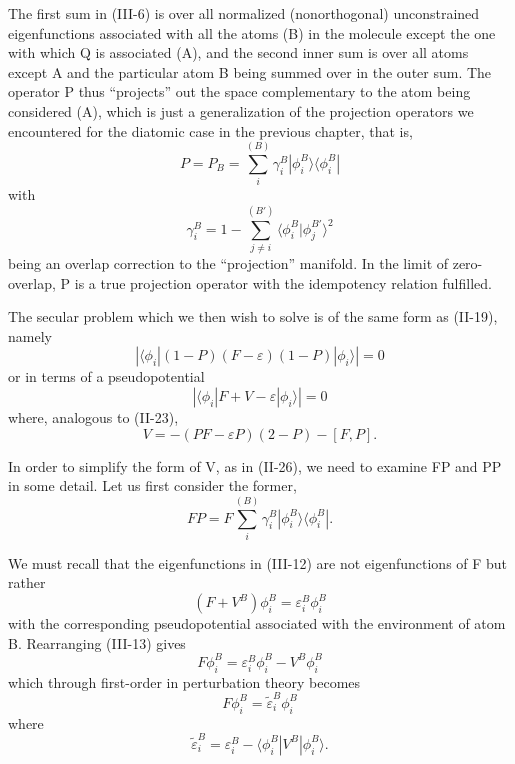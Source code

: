 \documentclass[12pt,letterpaper]{report}
\begin{document}
The first sum in (III-6) is over all normalized (nonorthogonal) unconstrained eigenfunctions associated with all the atoms (B) in the molecule except the one with which Q is associated (A), and the second inner sum is over all atoms except A and the particular atom B being summed over in the outer sum. The operator P thus ``projects'' out the space complementary to the atom being considered (A), which is just a generalization of the projection operators we encountered for the diatomic case in the previous chapter, that is,
\begin{equation}
P = P_B = \sum_i^{(B)} \gamma_i^B |\phi_i^B \rangle \langle \phi_i^B|
\end{equation}
with
\begin{equation}
\gamma_i^B = 1 - \sum_{j \neq i}^{(B')} \langle \phi_i^B | \phi_j^{B'} \rangle^2
\end{equation}
being an overlap correction to the ``projection'' manifold. In the limit of zero-overlap, P is a true projection operator with the idempotency relation fulfilled.

The secular problem which we then wish to solve is of the same form as (II-19), namely
\begin{equation}
|\langle \phi_i | (1 - P)(F - \varepsilon)(1 - P) | \phi_i \rangle| = 0
\end{equation}
or in terms of a pseudopotential
\begin{equation}
|\langle \phi_i | F + V - \varepsilon | \phi_i \rangle| = 0
\end{equation}
where, analogous to (II-23),
\begin{equation}
V = -(PF - \varepsilon P)(2 - P) - [F, P].
\end{equation}

In order to simplify the form of V, as in (II-26), we need to examine FP and PP in some detail. Let us first consider the former,
\begin{equation}
FP = F \sum_i^{(B)} \gamma_i^B |\phi_i^B \rangle \langle \phi_i^B|.
\end{equation}

We must recall that the eigenfunctions in (III-12) are not eigenfunctions of F but rather
\begin{equation}
(F + V^B) \phi_i^B = \varepsilon_i^B \phi_i^B
\end{equation}
with the corresponding pseudopotential associated with the environment of atom B. Rearranging (III-13) gives
\begin{equation}
F\phi_i^B = \varepsilon_i^B \phi_i^B - V^B \phi_i^B
\end{equation}
which through first-order in perturbation theory becomes
\begin{equation}
F\phi_i^B = \tilde{\varepsilon}_i^B \phi_i^B
\end{equation}
where
\begin{equation}
\tilde{\varepsilon}_i^B = \varepsilon_i^B - \langle \phi_i^B | V^B | \phi_i^B \rangle.
\end{equation}
\end{document}
